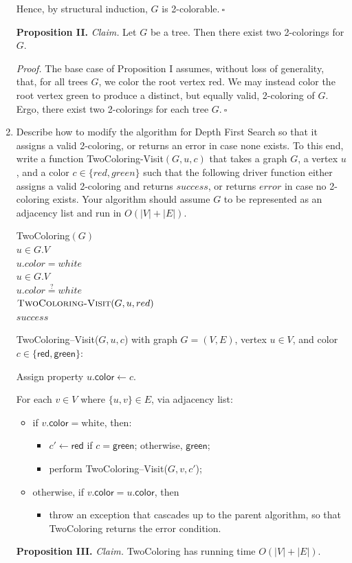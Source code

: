 \begin{enumerate}
\begin{solution}
Hence, by structural induction, $G$ is 2-colorable.$~\square$

\textbf{Proposition II. }\textit{Claim. }Let $G$ be a tree. Then there exist two 2-colorings for $G$.

\textit{Proof. }The base case of Proposition I assumes, without loss of generality, that, for all trees $G$, we color the root vertex red. We may instead color the root vertex green to produce a distinct, but equally valid, 2-coloring of $G$. Ergo, there exist two 2-colorings for each tree $G.~\square$
\end{solution}
\newpage
\item 
	Describe how to modify the algorithm for Depth First Search so that it assigns a valid 2-coloring, or returns an error in case none exists. To this end, write a function {\sc TwoColoring-Visit}$(G,u,c)$ that takes a graph $G$, a vertex $u$, and a color $c \in \{red,green\}$ such that the following driver function either assigns a valid 2-coloring and returns $success$, or returns $error$ in case no 2-coloring exists. Your algorithm should assume $G$ to be represented as an adjacency list and run in $O(|V| + |E|)$. 
	
	\begin{code}
		{\sc TwoColoring}$(G)$\\
		\> \For $u \in G.V$ \Do \\
		\> \> $u.color = white$ \\
		\> \For $u \in G.V$ \Do \\
		\> \> \If $u.color \stackrel{?}{=} white$ \Then \\
		\> \> \> $\text{\sc TwoColoring-Visit}(G,u,red)$ \\
		\> \Return $success$ \\
	\end{code}
\begin{solution}
{\sc TwoColoring--Visit}($G,u,c$) with graph $G=(V,E)$, vertex $u\in V$, and color $c\in\{\mathsf{red},\mathsf{green}\}$:

Assign property $u.\mathsf{color}\leftarrow c$.

For each $v\in V$ where $\{u,v\}\in E$, via adjacency list:
\begin{itemize}
\item if $v.\mathsf{color}=\text{white}$, then:
\begin{itemize}
    \item $c'\leftarrow\mathsf{red}$ if $c=\mathsf{green}$; otherwise, $\mathsf{green}$;
    \item perform {\sc TwoColoring--Visit}($G,v,c'$);
\end{itemize}
\item otherwise, if $v.\mathsf{color}=u.\mathsf{color}$, then
\begin{itemize}
    \item throw an exception that cascades up to the parent algorithm, so that {\sc TwoColoring} returns the error condition.
\end{itemize}
\end{itemize}
\textbf{Proposition III. }\textit{Claim. }{\sc TwoColoring} has running time $O(|V|+|E|)$.


\end{solution}
\end{enumerate}
